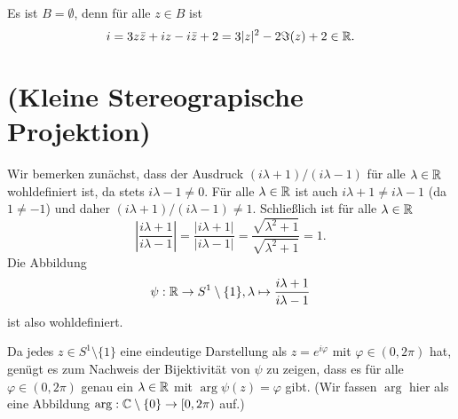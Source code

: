 \documentclass[a4paper,10pt]{article}
\begin{document}
\begin{center}
\end{center}





\subsection{}
Es ist $B = \emptyset$, denn für alle $z \in B$ ist
\[
 i = 3z\bar{z}+iz-i\bar{z}+2 = 3|z|^2 -2\Im(z) +2 \in \mathbb{R}.
\]





\section{(Kleine Stereograpische Projektion)}
Wir bemerken zunächst, dass der Ausdruck $(i\lambda+1)/(i\lambda-1)$ für alle $\lambda \in \mathbb{R}$ wohldefiniert ist, da stets $i\lambda-1 \neq 0$. Für alle $\lambda \in \mathbb{R}$ ist auch $i\lambda+1 \neq i\lambda-1$ (da $1 \neq -1$) und daher $(i\lambda+1)/(i\lambda-1) \neq 1$. Schließlich ist für alle $\lambda \in \mathbb{R}$
\[
 \left| \frac{i\lambda+1}{i\lambda-1} \right|
 = \frac{|i\lambda+1|}{|i\lambda-1|}
 = \frac{\sqrt{\lambda^2+1}}{\sqrt{\lambda^2+1}}
 = 1.
\]
Die Abbildung
\[
 \psi : \mathbb{R} \to S^1 \setminus \{1\}, \lambda \mapsto \frac{i\lambda+1}{i\lambda-1}
\]
ist also wohldefiniert.

Da jedes $z \in S^1 \setminus \{1\}$ eine eindeutige Darstellung als $z = e^{i\varphi}$ mit $\varphi \in (0,2\pi)$ hat, genügt es zum Nachweis der Bijektivität von $\psi$ zu zeigen, dass es für alle $\varphi \in (0,2\pi)$ genau ein $\lambda \in \mathbb{R}$ mit $\arg \psi(z) = \varphi$ gibt. (Wir fassen $\arg$ hier als eine Abbildung $\arg : \mathbb{C} \setminus \{0\} \to [0,2\pi)$ auf.)
\end{document}
